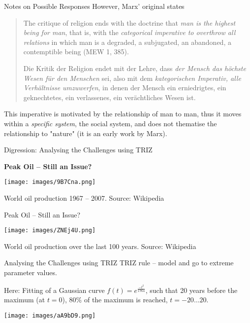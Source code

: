 \documentclass{beamer}
\newcommand{\ueberschrift}[1]{\begin{center}\bf #1\end{center}}
\begin{document}
\begin{frame}{Notes on Possible Responses}
  However, Marx' original states
  \begin{quote}\rm
    The critique of religion ends with the doctrine that \emph{man is the
      highest being for man}, that is, with the \emph{categorical imperative
      to overthrow all relations} in which man is a degraded, a subjugated, an
    abandoned, a contemptible being (MEW 1, 385).\medskip

    Die Kritik der Religion endet mit der Lehre, dass \emph{der Mensch das
      höchste Wesen für den Menschen} sei, also mit dem \emph{kategorischen
      Imperativ, alle Verhältnisse umzuwerfen}, in denen der Mensch ein
    erniedrigtes, ein geknechtetes, ein verlassenes, ein verächtliches Wesen
    ist.
  \end{quote}
  This imperative is motivated by the relationship of man to man, thus it
  moves within a \emph{specific system}, the social system, and does not
  thematise the relationship to "nature" (it is an early work by Marx).
\end{frame}

\begin{frame}{Digression: Analysing the Challenges using TRIZ}

  \ueberschrift{Peak Oil -- Still an Issue?}

  \begin{center}
    \texttt{[image: images/9B7Cna.png]}
  
    World oil production 1967 -- 2007. Source: Wikipedia
  \end{center}
\end{frame}

\begin{frame}{Peak Oil -- Still an Issue?}

  \begin{center}
    \texttt{[image: images/ZNEj4U.png]}
  
    World oil production over the last 100 years. Source: Wikipedia
  \end{center}
\end{frame}

\begin{frame}{Analysing the Challenges using TRIZ}
  TRIZ rule -- model and go to extreme parameter values.

  Here: Fitting of a Gaussian curve $f(t)=e^{\frac{-t^2}{1764}}$, such that 20
  years before the maximum (at $t=0$), 80\% of the maximum is reached,
  $t=-20\ldots20$.
  \begin{center}
    \texttt{[image: images/aA9bD9.png]}
  \end{center}
\end{frame}
\end{document}
